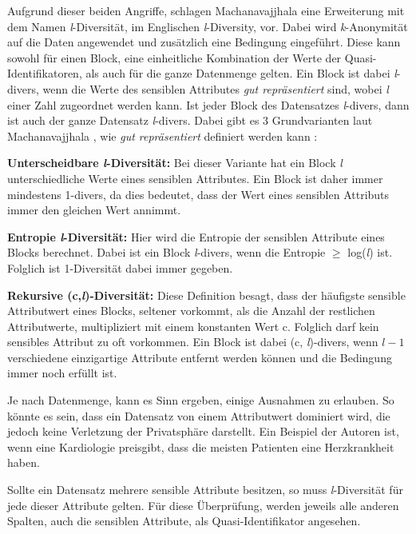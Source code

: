 Aufgrund dieser beiden Angriffe, schlagen Machanavajjhala \etal \cite{P-24} eine Erweiterung mit dem Namen \textit{l}-Diversität, im Englischen \textit{l}-Diversity, vor.
Dabei wird \textit{k}-Anonymität auf die Daten angewendet und zusätzlich eine Bedingung eingeführt. 
Diese kann sowohl für einen Block, eine einheitliche Kombination der Werte der Quasi-Identifikatoren, als auch für die ganze Datenmenge gelten.
Ein Block ist dabei \textit{l}-divers, wenn die Werte des sensiblen Attributes \textit{\dq gut repräsentiert\dq} sind, wobei \textit{l} einer Zahl zugeordnet werden kann.
Ist jeder Block des Datensatzes \textit{l}-divers, dann ist auch der ganze Datensatz \textit{l}-divers.
Dabei gibt es 3 Grundvarianten laut Machanavajjhala \etal, wie \textit{\dq gut repräsentiert\dq} definiert werden kann \cite{P-24}:
\begin{compactitem}
\item \textbf{Unterscheidbare \textit{l}-Diversität:} Bei dieser Variante hat ein Block \textit{l} unterschiedliche Werte eines sensiblen Attributes. Ein Block ist daher immer mindestens 1-divers, da dies bedeutet, dass der Wert eines sensiblen Attributs immer den gleichen Wert annimmt.
\item \textbf{Entropie \textit{l}-Diversität:} Hier wird die Entropie der sensiblen Attribute eines Blocks berechnet. Dabei ist ein Block \textit{l}-divers, wenn die Entropie $\ge$ log(\textit{l}) ist. Folglich ist 1-Diversität dabei immer gegeben.
\item \textbf{Rekursive (c,\textit{l})-Diversität:} Diese Definition besagt, dass der häufigste sensible Attributwert eines Blocks, seltener vorkommt, als die Anzahl der restlichen Attributwerte, multipliziert mit einem konstanten Wert c. Folglich darf kein sensibles Attribut zu oft vorkommen. Ein Block ist dabei (c, \textit{l})-divers, wenn $\textit{l} - 1$ verschiedene einzigartige Attribute entfernt werden können und die Bedingung immer noch erfüllt ist.
\end{compactitem}

Je nach Datenmenge, kann es Sinn ergeben, einige Ausnahmen zu erlauben.
So könnte es sein, dass ein Datensatz von einem Attributwert dominiert wird, die jedoch keine Verletzung der Privatsphäre darstellt. 
Ein Beispiel der Autoren ist, wenn eine Kardiologie preisgibt, dass die meisten Patienten eine Herzkrankheit haben.

Sollte ein Datensatz mehrere sensible Attribute besitzen, so muss \textit{l}-Diversität für jede dieser Attribute gelten. 
Für diese Überprüfung, werden jeweils alle anderen Spalten, auch die sensiblen Attribute, als Quasi-Identifikator angesehen.

